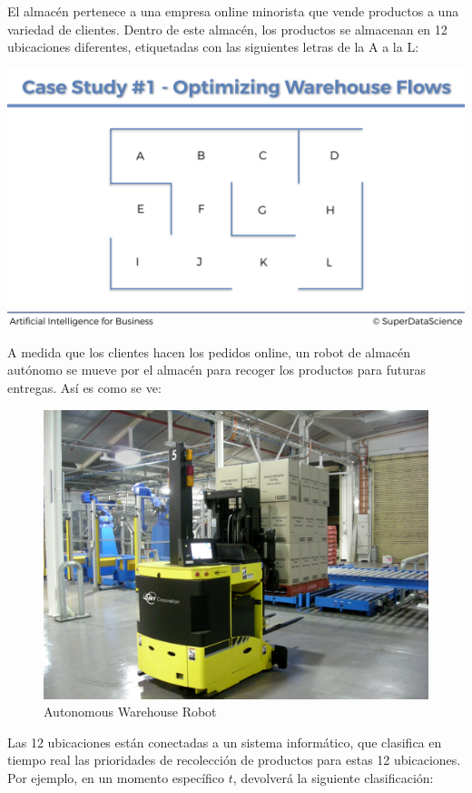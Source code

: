 \documentclass[]{book}
\begin{document}
El almacén pertenece a una empresa online minorista que vende productos a una variedad de clientes. Dentro de este almacén, los productos se almacenan en 12 ubicaciones diferentes, etiquetadas con las siguientes letras de la A a la L:

\includegraphics[width=1\textwidth,height=\textheight]{Images/Warehouse_2.png}

A medida que los clientes hacen los pedidos online, un robot de almacén autónomo se mueve por el almacén para recoger los productos para futuras entregas. Así es como se ve:

\begin{figure}
\centering
\includegraphics[width=1\textwidth,height=\textheight]{Images/Autonomous_Warehouse_Robot.jpg}
\caption{Autonomous Warehouse Robot}
\end{figure}

Las 12 ubicaciones están conectadas a un sistema informático, que clasifica en tiempo real las prioridades de recolección de productos para estas 12 ubicaciones. Por ejemplo, en un momento específico \(t\), devolverá la siguiente clasificación:
\end{document}
